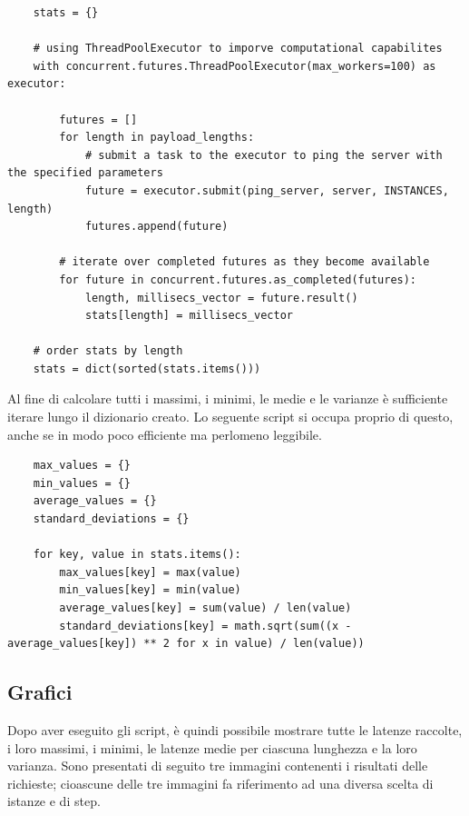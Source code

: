 \begin{lstlisting}
    stats = {}
    
    # using ThreadPoolExecutor to imporve computational capabilites
    with concurrent.futures.ThreadPoolExecutor(max_workers=100) as executor:
        
        futures = []
        for length in payload_lengths:
            # submit a task to the executor to ping the server with the specified parameters
            future = executor.submit(ping_server, server, INSTANCES, length)
            futures.append(future)
            
        # iterate over completed futures as they become available
        for future in concurrent.futures.as_completed(futures):
            length, millisecs_vector = future.result()
            stats[length] = millisecs_vector
    
    # order stats by length
    stats = dict(sorted(stats.items()))
\end{lstlisting}

\noindent Al fine di calcolare tutti i massimi, i minimi, le medie e le varianze è sufficiente iterare lungo il dizionario creato. Lo seguente script si occupa proprio di questo, anche se in modo poco efficiente ma perlomeno leggibile.

\begin{lstlisting}
    max_values = {}
    min_values = {}
    average_values = {}
    standard_deviations = {}

    for key, value in stats.items():
        max_values[key] = max(value)
        min_values[key] = min(value)
        average_values[key] = sum(value) / len(value)
        standard_deviations[key] = math.sqrt(sum((x - average_values[key]) ** 2 for x in value) / len(value))
\end{lstlisting}

\vspace{10px}\subsection*{Grafici}

\noindent Dopo aver eseguito gli script, è quindi possibile mostrare tutte le latenze raccolte, i loro massimi, i minimi, le latenze medie per ciascuna lunghezza e la loro varianza. Sono presentati di seguito tre immagini contenenti i risultati delle richieste; cioascune delle tre immagini fa riferimento ad una diversa scelta di istanze e di step.


